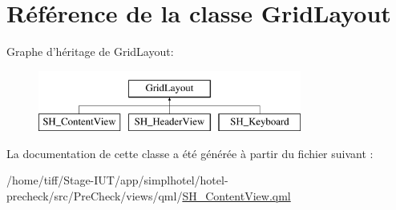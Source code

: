 \hypertarget{classGridLayout}{\section{Référence de la classe Grid\-Layout}
\label{classGridLayout}
}
Graphe d'héritage de Grid\-Layout\-:\begin{figure}[H]
\begin{center}
\leavevmode
\includegraphics[height=2.000000cm]{classGridLayout}
\end{center}
\end{figure}


La documentation de cette classe a été générée à partir du fichier suivant \-:\begin{DoxyCompactItemize}
\item 
/home/tiff/\-Stage-\/\-I\-U\-T/app/simplhotel/hotel-\/precheck/src/\-Pre\-Check/views/qml/\hyperlink{SH__ContentView_8qml}{S\-H\-\_\-\-Content\-View.\-qml}\end{DoxyCompactItemize}
